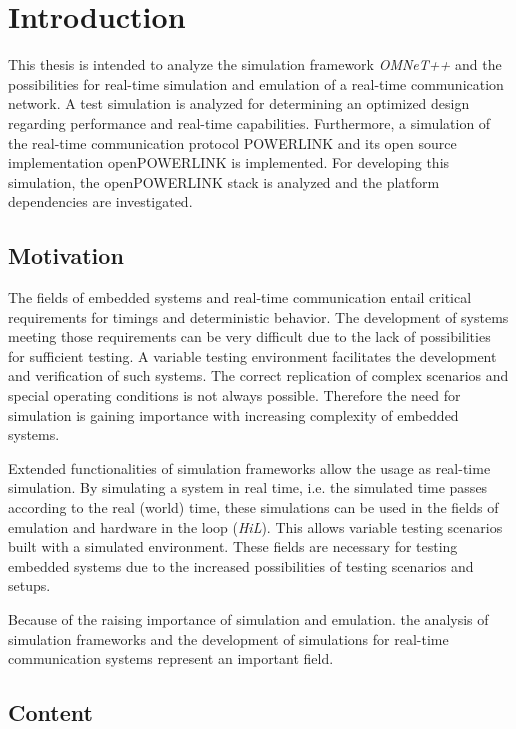 \chapter{Introduction}
\label{cha:introduction}
This thesis is intended to analyze the simulation framework \emph{OMNeT++} \cite{omnet_manual} and the possibilities for real-time simulation and emulation of a real-time communication network.
A test simulation is analyzed for determining an optimized design regarding performance and real-time capabilities.
Furthermore, a simulation of the real-time communication protocol POWERLINK and its open source implementation \mbox{openPOWERLINK} \cite{openpowerlink} is implemented. 
For developing this simulation, the openPOWERLINK stack is analyzed and the platform dependencies are investigated.

\section{Motivation}
The fields of embedded systems and real-time communication entail critical requirements for timings and deterministic behavior.
The development of systems meeting those requirements can be very difficult due to the lack of possibilities for sufficient testing.
A variable testing environment facilitates the development and verification of such systems.
The correct replication of complex scenarios and special operating conditions is not always possible.
Therefore the need for simulation is gaining importance with increasing complexity of embedded systems.

Extended functionalities of simulation frameworks allow the usage as real-time simulation.
By simulating a system in real time, i.e. the simulated time passes according to the real (world) time, these simulations can be used in the fields of emulation and hardware in the loop (\emph{HiL}).
This allows variable testing scenarios built with a simulated environment.
These fields are necessary for testing embedded systems due to the increased possibilities of testing scenarios and setups.

Because of the raising importance of simulation and emulation. the analysis of simulation frameworks and the development of simulations for real-time communication systems represent an important field.

\section{Content}

